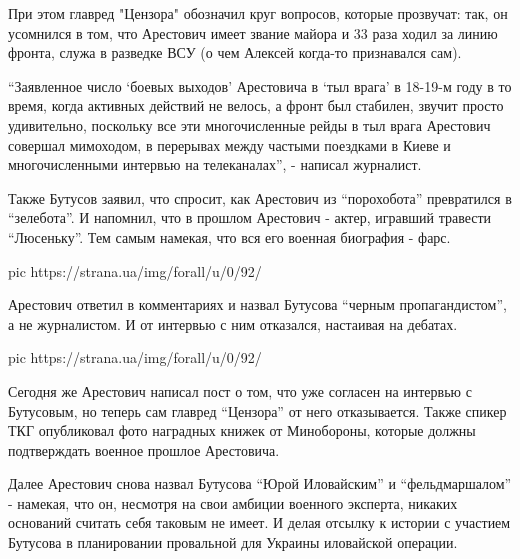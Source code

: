 При этом главред "Цензора" обозначил круг вопросов, которые прозвучат:
так, он усомнился в том, что Арестович имеет звание майора и 33 раза ходил
за линию фронта, служа в разведке ВСУ (о чем Алексей когда-то признавался
сам). 

\enquote{Заявленное число \enquote{боевых выходов} Арестовича в \enquote{тыл врага} в 18-19-м году
в то время, когда активных действий не велось, а фронт был стабилен,
звучит просто удивительно, поскольку все эти многочисленные рейды в тыл
врага Арестович совершал мимоходом, в перерывах между частыми поездками в
Киеве и многочисленными интервью на телеканалах}, - написал журналист. 

Также Бутусов заявил, что спросит, как Арестович из \enquote{порохобота}
превратился в \enquote{зелебота}. И напомнил, что в прошлом Арестович - актер,
игравший травести \enquote{Люсеньку}. Тем самым намекая, что вся его военная
биография - фарс. 

\ifcmt
pic https://strana.ua/img/forall/u/0/92/%
\fi

Арестович ответил в комментариях и назвал Бутусова \enquote{черным
пропагандистом}, а не журналистом. И от интервью с ним отказался,
настаивая на дебатах.

\ifcmt
pic https://strana.ua/img/forall/u/0/92/%
\fi

Сегодня же Арестович написал пост о том, что уже согласен на интервью с
Бутусовым, но теперь сам главред \enquote{Цензора} от него отказывается. Также
спикер ТКГ опубликовал фото наградных книжек от Минобороны, которые должны
подтверждать военное прошлое Арестовича. 

Далее Арестович снова назвал Бутусова \enquote{Юрой Иловайским} и \enquote{фельдмаршалом}
- намекая, что он, несмотря на свои амбиции военного эксперта, никаких
оснований считать себя таковым не имеет. И делая отсылку к истории с
участием Бутусова в планировании провальной для Украины иловайской
операции.

